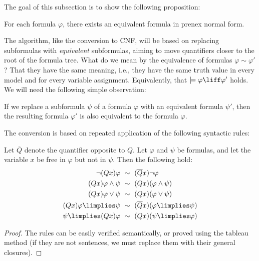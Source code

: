 The goal of this subsection is to show the following proposition:

\begin{proposition}\label{proposition:convert-to-pnf}
    For each formula $\varphi$, there exists an equivalent formula in prenex normal form.    
\end{proposition}

The algorithm, like the conversion to CNF, will be based on replacing subformulas with \emph{equivalent} subformulas, aiming to move quantifiers closer to the root of the formula tree. What do we mean by the equivalence of formulas $\varphi\sim\varphi'$? That they have the same meaning, i.e., they have the same truth value in every model and for every variable assignment. Equivalently, that $\models\varphi\liff\varphi'$ holds. We will need the following simple observation:

\begin{observation}\label{observation:pnf-one-step}
    If we replace a subformula $\psi$ of a formula $\varphi$ with an equivalent formula $\psi'$, then the resulting formula $\varphi'$ is also equivalent to the formula $\varphi$.
\end{observation}

The conversion is based on repeated application of the following syntactic rules:

\begin{lemma}\label{lemma:pnf-conversion-rules}
    Let $\overline{Q}$ denote the quantifier opposite to $Q$. Let $\varphi$ and $\psi$ be formulas, and let the variable $x$ be free in $\varphi$ but not in $\psi$. Then the following hold:
    \begin{align*}
        \neg (Qx)\varphi\ &\sim\ (\overline{Q}x)\neg\varphi\\
        (Qx)\varphi \land \psi\ &\sim\ (Qx)(\varphi \land \psi)\\
        (Qx)\varphi \lor \psi\ &\sim\ (Qx)(\varphi \lor \psi)\\
        (Qx)\varphi \limplies \psi\ &\sim\ (\overline{Q}x)(\varphi \limplies \psi)\\
        \psi \limplies (Qx)\varphi\ &\sim\ (Qx)(\psi \limplies \varphi)
    \end{align*}
\end{lemma}
\begin{proof}
    The rules can be easily verified semantically, or proved using the tableau method (if they are not sentences, we must replace them with their general closures).   
\end{proof}

